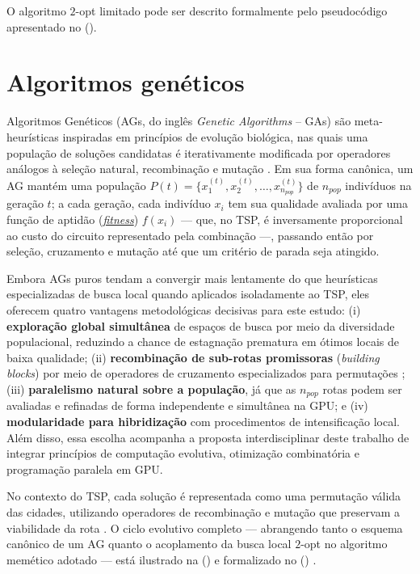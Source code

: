 O algoritmo \(2\)-opt limitado pode ser descrito formalmente pelo pseudocódigo apresentado no  ().

\section{Algoritmos genéticos}\label{sec-23-algoritmos-geneticos}

Algoritmos Genéticos (AGs, do inglês \emph{Genetic Algorithms} -- GAs) são meta-heurísticas inspiradas em princípios de evolução biológica, nas quais uma população de soluções candidatas é iterativamente modificada por operadores análogos à seleção natural, recombinação e mutação \autocite{goldberg1989genetic,eiben2015introduction}.
Em sua forma canônica, um AG mantém uma população \(P(t) = \{x_1^{(t)}, x_2^{(t)}, \dots, x_{n_{pop}}^{(t)}\}\) de \(n_{pop}\) indivíduos na geração \(t\); a cada geração, cada indivíduo \(x_i\) tem sua qualidade avaliada por uma função de aptidão (\hyperlink{term:fitness}{\emph{fitness}}) \(f(x_i)\) --- que, no TSP, é inversamente proporcional ao custo do circuito representado pela combinação ---, passando então por seleção, cruzamento e mutação até que um critério de parada seja atingido.

Embora AGs puros tendam a convergir mais lentamente do que heurísticas especializadas de busca local quando aplicados isoladamente ao TSP, eles oferecem quatro vantagens metodológicas decisivas para este estudo:
(i) \textbf{exploração global simultânea} de espaços de busca por meio da diversidade populacional, reduzindo a chance de estagnação prematura em ótimos locais de baixa qualidade;
(ii) \textbf{recombinação de sub-rotas promissoras} (\emph{building blocks}) por meio de operadores de cruzamento especializados para permutações \autocite{goldberg1989genetic,larranaga1999genetic};
(iii) \textbf{paralelismo natural sobre a população}, já que as \(n_{pop}\) rotas podem ser avaliadas e refinadas de forma independente e simultânea na GPU; e
(iv) \textbf{modularidade para hibridização} com procedimentos de intensificação local.
Além disso, essa escolha acompanha a proposta interdisciplinar deste trabalho de integrar princípios de computação evolutiva, otimização combinatória e programação paralela em GPU.

No contexto do TSP, cada solução é representada como uma permutação válida das cidades, utilizando operadores de recombinação e mutação que preservam a viabilidade da rota \autocite{larranaga1999genetic}.
O ciclo evolutivo completo --- abrangendo tanto o esquema canônico de um AG quanto o acoplamento da busca local \(2\)-opt no algoritmo memético adotado --- está ilustrado na  () e formalizado no  () \autocite{goldberg1989genetic,eiben2015introduction}.

